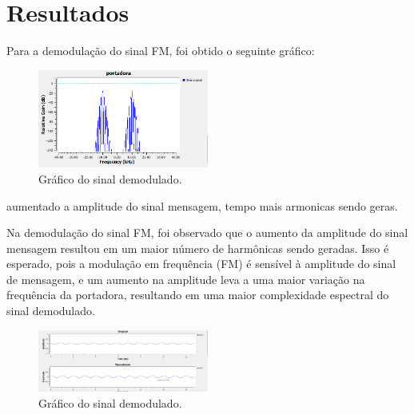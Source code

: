 \section{Resultados}

Para a demodulação do sinal FM, foi obtido o seguinte gráfico:

\begin{figure}[!h]
    \centering
    \includegraphics[width=0.5\textwidth]{images/sinal_fm_p.png}
    \caption{Gráfico do sinal demodulado.}
    \label{fig:resultado_demodulacao}
\end{figure}

aumentado a amplitude do sinal mensagem, tempo mais armonicas sendo geras.

Na demodulação do sinal FM, foi observado que o aumento da amplitude do sinal mensagem resultou em um maior número de harmônicas sendo geradas. Isso é esperado, pois a modulação em frequência (FM) é sensível à amplitude do sinal de mensagem, e um aumento na amplitude leva a uma maior variação na frequência da portadora, resultando em uma maior complexidade espectral do sinal demodulado.

\begin{figure}[!h]
    \centering
    \includegraphics[width=0.5\textwidth]{images/cdm.png}
    \caption{Gráfico do sinal demodulado.}
    \label{fig:resultado_demodulacao}

\end{figure}

